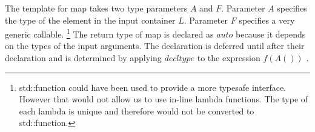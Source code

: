 \documentclass[12pt,fleqn]{article}
\begin{document}
The template for map takes two type parameters $A$ and $F$. 
Parameter $A$ specifies the type of the element in the input container $L$.  
Parameter $F$ specifies a very generic callable. 
\footnote{
std::function could have been used to provide a more typesafe interface.
However that would not allow us to use in-line lambda functions.
The type of each lambda is unique and therefore would not be converted to std::function.
}
The return type of map is declared as $auto$ because it depends on the types of the input arguments.
The declaration is deferred until after their declaration and is determined by applying $decltype$ to the expression $f(A())$ \cite{josuttis, auto, decltype}.

\begin{comment}
\begin{lstlisting}[caption=using std;:bind to combine functions, label=combine ]
[...]
std::function< std::function <int(int)>(int)> cplus   = [] (int x) {
    return [=] (int y) {
      return 4 * x + y;
    };
  };

 auto l = std::bind([](std::function<int(int)> f){return f(2);},
		     std::bind(cplus, std::placeholders::_1));

  map(show, map(l, L)); //prints 6,270,358,94,182,6,14,398,-358,

\end{lstlisting}
Listing \ref{combine} illustrates how function combination can be used to limit the number of iterations and list copies.
The resulting function $l$ is then mapped over list $L$.
The inner bind takes the function $cplus$ as the first argument and has a placeholder $\_1$ as the second argument.
The callable object returned by the inner bind is then used as the argument input to the function of the outer bind. 
The function of the outer bind is a lambda which has a function as input.
In the body of the lambda this function is called with 2 and it's result is returned.
The resulting callable object $l$ is the function is $f(x)\ = 4 * x + 2$.
The placeholder is bound to the first argument of $cplus$ and 2 is used as the value for the second argument.
The result of mapping is printed to std::cout and the output is shown in the comment. 
Note that 94 the result of 4 * 23 + 2, 182 the result of 4 * 45 + 2 etc.
\end{comment}
%
%
\end{document}
